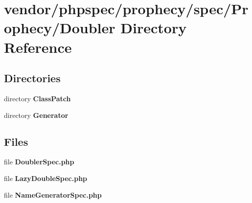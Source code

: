 \section{vendor/phpspec/prophecy/spec/\+Prophecy/\+Doubler Directory Reference}
\label{dir_0a9b13dce8c3977c71dedf6d489a349d}
\subsection*{Directories}
\begin{DoxyCompactItemize}
\item 
directory {\bf Class\+Patch}
\item 
directory {\bf Generator}
\end{DoxyCompactItemize}
\subsection*{Files}
\begin{DoxyCompactItemize}
\item 
file {\bf Doubler\+Spec.\+php}
\item 
file {\bf Lazy\+Double\+Spec.\+php}
\item 
file {\bf Name\+Generator\+Spec.\+php}
\end{DoxyCompactItemize}
